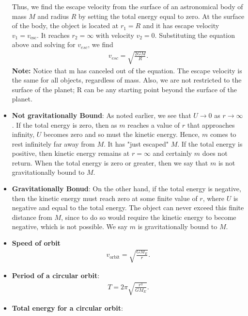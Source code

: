 \documentclass{report}
\begin{document}
\begin{itemize}
            \bigbreak \noindent 
            Thus, we find the escape velocity from the surface of an astronomical body of mass \(M\) and radius \(R\) by setting the total energy equal to zero. At the surface of the body, the object is located at \(r_1 = R\) and it has escape velocity \(v_1 = v_{\text{esc}}\). It reaches \(r_2 = \infty\) with velocity \(v_2 = 0\). Substituting the equation above and solving for $v_{esc}$, we find
            \begin{align*}
                v_{esc} = \sqrt{\frac{2GM}{R}}
            .\end{align*}
            \bigbreak \noindent 
            \textbf{Note:} Notice that m has canceled out of the equation. The escape velocity is the same for all objects, regardless of mass. Also, we are not restricted to the surface of the planet; R can be any starting point beyond the surface of the planet.
        \item \textbf{Not gravitationally Bound}: 
            As noted earlier, we see that \(U \rightarrow 0\) as \(r \rightarrow \infty\). If the total energy is zero, then as \(m\) reaches a value of \(r\) that approaches infinity, \(U\) becomes zero and so must the kinetic energy. Hence, \(m\) comes to rest infinitely far away from \(M\). It has "just escaped" \(M\). If the total energy is positive, then kinetic energy remains at \(r = \infty\) and certainly \(m\) does not return. When the total energy is zero or greater, then we say that \(m\) is not gravitationally bound to \(M\).
        \item \textbf{Gravitationally Bonud}:
            On the other hand, if the total energy is negative, then the kinetic energy must reach zero at some finite value of \(r\), where \(U\) is negative and equal to the total energy. The object can never exceed this finite distance from \(M\), since to do so would require the kinetic energy to become negative, which is not possible. We say \(m\) is gravitationally bound to \(M\).
        \item \textbf{Speed of orbit}
            \begin{align*}
                v_{\text{orbit}} = \sqrt{\frac{GM_{E}}{r}}
            .\end{align*}
        \item \textbf{Period of a circular orbit}:
            \begin{align*}
                T = 2\pi \sqrt{\frac{r^{3}}{GM_{E}}}
            .\end{align*}
        \item \textbf{Total energy for a circular orbit}:

\end{itemize}
\end{document}
